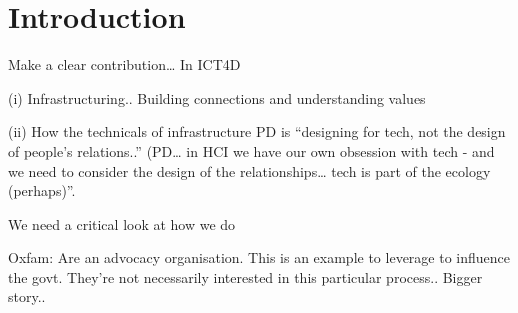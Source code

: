 \section{Introduction}

Make a clear contribution…
In ICT4D 

(i) Infrastructuring.. Building connections and understanding values

(ii) How the technicals of infrastructure PD is “designing for tech, not the design of people’s relations..” (PD… in HCI we have our own obsession with tech - and we need to consider the design of the relationships… tech is part of the ecology (perhaps)”. 

We need a critical look at how we do 

Oxfam: Are an advocacy organisation. This is an example to leverage to influence the govt. They’re not necessarily interested in this particular process.. Bigger story.. 
